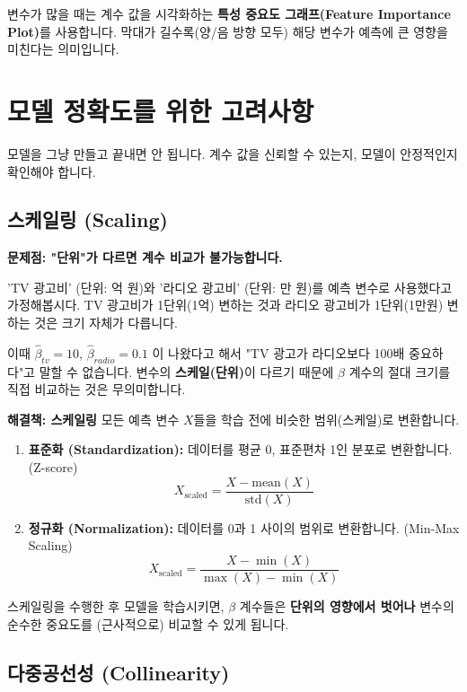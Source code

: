 \documentclass[11pt,a4paper]{book}
\theoremstyle{definition}
\begin{document}
변수가 많을 때는 계수 값을 시각화하는 \textbf{특성 중요도 그래프(Feature Importance Plot)}를 사용합니다. 막대가 길수록(양/음 방향 모두) 해당 변수가 예측에 큰 영향을 미친다는 의미입니다.

\section{모델 정확도를 위한 고려사항}

모델을 그냥 만들고 끝내면 안 됩니다. 계수 값을 신뢰할 수 있는지, 모델이 안정적인지 확인해야 합니다.

\subsection{스케일링 (Scaling)}

\begin{warningbox}
\textbf{문제점: "단위"가 다르면 계수 비교가 불가능합니다.}

'TV 광고비' (단위: 억 원)와 '라디오 광고비' (단위: 만 원)를 예측 변수로 사용했다고 가정해봅시다.
TV 광고비가 1단위(1억) 변하는 것과 라디오 광고비가 1단위(1만원) 변하는 것은 크기 자체가 다릅니다.

이때 $\hat{\beta}_{tv} = 10$, $\hat{\beta}_{radio} = 0.1$ 이 나왔다고 해서 "TV 광고가 라디오보다 100배 중요하다"고 말할 수 없습니다.
변수의 \textbf{스케일(단위)}이 다르기 때문에 $\beta$ 계수의 절대 크기를 직접 비교하는 것은 무의미합니다.
\end{warningbox}

\textbf{해결책: 스케일링}
모든 예측 변수 $X$들을 학습 전에 비슷한 범위(스케일)로 변환합니다.

\begin{enumerate}
    \item \textbf{표준화 (Standardization):} 데이터를 평균 0, 표준편차 1인 분포로 변환합니다. (Z-score)
    $$ X_{\text{scaled}} = \frac{X - \text{mean}(X)}{\text{std}(X)} $$
    \item \textbf{정규화 (Normalization):} 데이터를 0과 1 사이의 범위로 변환합니다. (Min-Max Scaling)
    $$ X_{\text{scaled}} = \frac{X - \min(X)}{\max(X) - \min(X)} $$
\end{enumerate}

스케일링을 수행한 후 모델을 학습시키면, $\beta$ 계수들은 \textbf{단위의 영향에서 벗어나} 변수의 순수한 중요도를 (근사적으로) 비교할 수 있게 됩니다.

\subsection{다중공선성 (Collinearity)}
\end{document}
